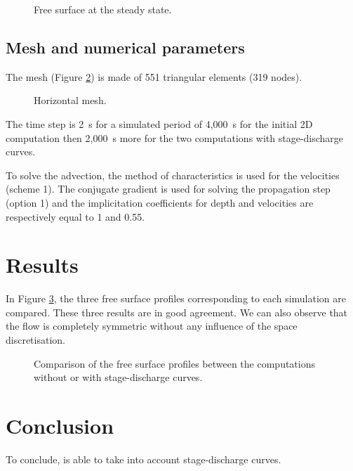 \begin{figure}[!htbp]
 \centering
 \caption{Free surface at the steady state.}
 \label{t2d:canal:fig:freeSurface}
\end{figure}

\subsection{Mesh and numerical parameters}
\bigskip
The mesh (Figure \ref{t2d:canal:fig:meshH})
is made of 551 triangular elements (319 nodes).

\begin{figure}[!htbp]
 \centering
 \caption{Horizontal mesh.}
 \label{t2d:canal:fig:meshH}
\end{figure}

The time step is 2~s for a simulated period of 4,000~s for the initial 2D
computation then 2,000~s more for the two computations with stage-discharge
curves.

To solve the advection, the method of characteristics
is used for the velocities (scheme 1).
The conjugate gradient
is used for solving the propagation step (option 1) and
the implicitation coefficients 
for depth and velocities are respectively equal to 1 and 0.55. 

\section{Results}

In Figure \ref{t2d:canal:fig:profiles}, the three free surface profiles
corresponding to each simulation are compared.
These three results are in good agreement.
We can also observe that the flow is completely symmetric without
any influence of the space discretisation.

\begin{figure}[!htbp]
 \centering
 \caption{Comparison of the free surface profiles between the
 computations without or with stage-discharge curves. }
 \label{t2d:canal:fig:profiles}
 \end{figure}
 
\section{Conclusion}

To conclude,  is able to take into account stage-discharge curves.
